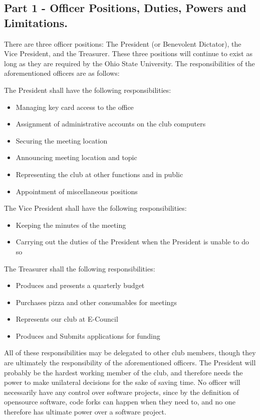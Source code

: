 \documentclass{article}
\begin{document}

	\subsection{Part 1 - Officer Positions, Duties, Powers and Limitations.}

	There are three officer positions: The President (or Benevolent Dictator), the Vice President, and the Treasurer.  These three positions will continue to exist as long as they are required by the Ohio State University.  The responsibilities of the aforementioned officers are as follows:

	The President shall have the following responsibilities:

	\begin{itemize}
		\item Managing key card access to the office
		\item Assignment of administrative accounts on the club computers
		\item Securing the meeting location
		\item Announcing meeting location and topic
		\item Representing the club at other functions and in public
		\item Appointment of miscellaneous positions
	\end{itemize}

	The Vice President shall have the following responsibilities:
	\begin{itemize}
		\item Keeping the minutes of the meeting
		\item Carrying out the duties of the President when the President is unable to do so
	\end{itemize}

	The Treasurer shall the following responsibilities:

	\begin{itemize}
		\item Produces and presents a quarterly budget
		\item Purchases pizza and other consumables for meetings
		\item Represents our club at E-Council
		\item Produces and Submits applications for funding
	\end{itemize}

	All of these responsibilities may be delegated to other club members, though they are ultimately the responsibility of the aforementioned officers.  The President will probably be the hardest working member of the club, and therefore needs the power to make unilateral decisions for the sake of saving time.  No officer will necessarily have any control over software projects, since by the definition of opensource software, code forks can happen when they need to, and no one therefore has ultimate power over a software project.
\end{document}
